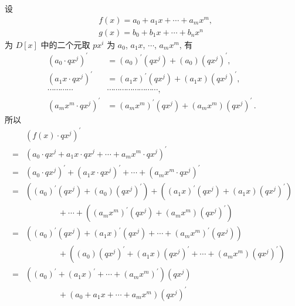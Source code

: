\begin{pf}
    设
    \begin{align*}
         & f(x) = a_0 + a_1 x + \cdots + a_m x^m, \\
         & g(x) = b_0 + b_1 x + \cdots + b_n x^n
    \end{align*}
    为 $D[x]$ 中的二个元\period 取 $px^i$ 为 $a_0$, $a_1 x$, $\cdots$, $a_m x^m$, 有
    \begin{align*}
        (a_0 \cdot qx^j)^{\prime}     & = (a_0)^{\prime} (qx^j) + (a_0) (qx^j)^{\prime},                \\
        (a_1 x \cdot qx^j)^{\prime}   & = (a_1 x)^{\prime} (qx^j) + (a_1 x) (qx^j)^{\prime},            \\
        \cdots \cdots \cdots \cdots   & \cdots \cdots \cdots \cdots \cdots \cdots \cdots \cdots,        \\
        (a_m x^m \cdot qx^j)^{\prime} & = (a_m x^m)^{\prime} (qx^j) + (a_m x^m) (qx^j)^{\prime} \period
    \end{align*}
    所以
    \begin{align*}
             & (f(x) \cdot qx^j)^{\prime}                                                                             \\
        = {} & (a_0 \cdot qx^j + a_1 x \cdot qx^j + \cdots + a_m x^m \cdot qx^j)^{\prime}                             \\
        = {} & (a_0 \cdot qx^j)^{\prime} + (a_1 x \cdot qx^j)^{\prime} + \cdots
        + (a_m x^m \cdot qx^j)^{\prime}                                                                               \\
        = {} & ((a_0)^{\prime} (qx^j) + (a_0) (qx^j)^{\prime}) + ((a_1 x)^{\prime} (qx^j)
        + (a_1 x) (qx^j)^{\prime})                                                                                    \\
             & \qquad \qquad + \cdots + ((a_m x^m)^{\prime} (qx^j) + (a_m x^m) (qx^j)^{\prime})                       \\
        = {} & ((a_0)^{\prime} (qx^j) + (a_1 x)^{\prime} (qx^j) + \cdots + (a_m x^m)^{\prime} (qx^j))                 \\
             & \qquad \qquad + ((a_0) (qx^j)^{\prime} + (a_1 x) (qx^j)^{\prime} + \cdots + (a_m x^m) (qx^j)^{\prime}) \\
        = {} & ((a_0)^{\prime} + (a_1 x)^{\prime} + \cdots + (a_m x^m)^{\prime}) (qx^j)                               \\
             & \qquad \qquad + (a_0 + a_1 x + \cdots + a_m x^m) (qx^j)^{\prime}                                       \\

\end{align*}
\end{pf}
